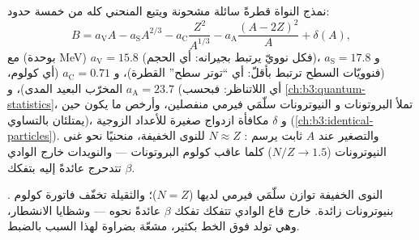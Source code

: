 \begin{proposition}\label{prop:b3:nuclear-physics:semf}
نمذج النواة قطرةً سائلة مشحونة ويتبع المنحني
كله من خمسة حدود:
\[
B = a_{\text{V}}A - a_{\text{S}}A^{2/3}
- a_{\text{C}}\frac{Z^2}{A^{1/3}}
- a_{\text{A}}\frac{(A - 2Z)^2}{A} + \delta(A) ,
\]
مع (بوحدة \unit{MeV}) $a_{\text{V}} = 15.8$ (فكل نوويّ يرتبط
بجيرانه: أي الحجم)، و $a_{\text{S}} = 17.8$ (فنوويّات السطح ترتبط
بأقلّ: أي ``توتر سطح'' القطرة)، و $a_{\text{C}} = 0.71$
(أي كولوم، المخرّب البعيد المدى)، و $a_{\text{A}} = 23.7$
(أي اللاتناظر: فبحسب \cref{ch:b3:quantum-statistics}، تملأ البروتونات و
النيوترونات سلّمَي فيرمي منفصلين، وأرخص ما يكون حين يمتلئان
بالتساوي)، و $\delta$ مكافأة ازدواج صغيرة للأعداد الزوجية
(\cref{ch:b3:identical-particles}). والتصغير عند $A$ ثابت يرسم
\emph{}: $N \approx Z$ للنوى الخفيفة،
منحنيًا نحو غنى النيوترونات ($N/Z \to 1.5$) كلما عاقب كولوم البروتونات
--- والنويدات خارج الوادي تتدحرج عائدةً إليه بتفكك $\beta$.
\end{proposition}
\admitted

\begin{omfigure}

{\small {}. النوى الخفيفة توازن سلّمَي
فيرمي لديها ($N = Z$)؛ والثقيلة تخفّف فاتورة كولوم
بنيوترونات زائدة.  خارج قاع الوادي تتفكك تفكك $\beta$ عائدةً
نحوه --- وشظايا الانشطار، وهي تولد فوق الخط بكثير،
مشعّة بضراوة لهذا السبب بالضبط.}
\end{omfigure}

